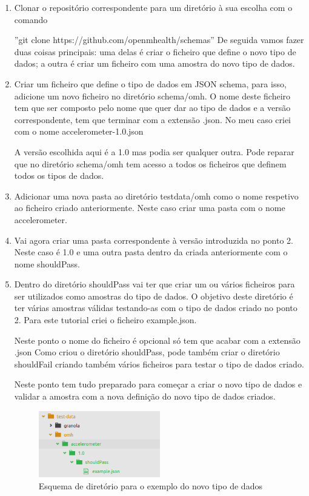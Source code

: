 \begin{enumerate}
  \item Clonar o repositório correspondente para um diretório à sua escolha com o comando \par
  ''git clone https://github.com/openmhealth/schemas'' 
  De seguida vamos fazer duas coisas principais: uma delas é criar o ficheiro que define o novo tipo de dados; a outra é criar um ficheiro com uma amostra do novo tipo de dados.
  \item Criar um ficheiro que define o tipo de dados em \gls{JSON} schema, para isso, adicione um novo ficheiro no diretório schema/omh. O nome deste ficheiro tem que ser composto pelo nome que quer dar ao tipo de dados e a versão correspondente, tem que terminar com a extensão .json. No meu caso criei com o nome accelerometer-1.0.json  \par A versão escolhida aqui é a 1.0 mas podia ser qualquer outra. Pode reparar que no diretório schema/omh tem acesso a todos os ficheiros que definem todos os tipos de dados.
  \item Adicionar uma nova pasta ao diretório testdata/omh como o nome respetivo ao ficheiro criado anteriormente. Neste caso criar uma pasta com o nome accelerometer.
  \item Vai agora criar uma pasta correspondente à versão introduzida no ponto 2. Neste caso é 1.0 e uma outra pasta dentro da criada anteriormente com o nome shouldPass.
  \item Dentro do diretório shouldPass vai ter que criar um ou vários ficheiros para ser utilizados como amostras do tipo de dados. O objetivo deste diretório é ter várias amostras válidas testando-as com o tipo de dados criado no ponto 2. Para este tutorial criei o ficheiro example.json. \par Neste ponto o nome do ficheiro é opcional só tem que acabar com a extensão .json
  Como criou o diretório shouldPass, pode também criar o diretório shouldFail criando também vários ficheiros para testar o tipo de dados criado. \par 
  Neste ponto tem tudo preparado para começar a criar o novo tipo de dados e validar a amostra com a nova definição do novo tipo de dados criados.
  
  \begin{figure}[!ht]
  \centering
  \includegraphics[width=0.5\textwidth]{imgs/newsampledata.png}
  \caption[Esquema de diretório para o novo sample]{Esquema de diretório para o exemplo do novo tipo de dados}
  

\end{figure}
\end{enumerate}
